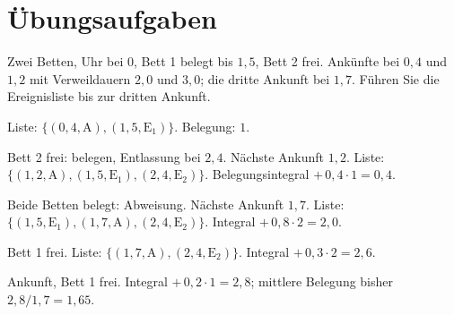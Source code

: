 \section{Übungsaufgaben}

\begin{aufgabe}
Zwei Betten, Uhr bei $0$, Bett 1 belegt bis $1{,}5$, Bett 2 frei. Ankünfte bei $0{,}4$ und $1{,}2$ mit Verweildauern $2{,}0$ und $3{,}0$; die dritte Ankunft bei $1{,}7$. Führen Sie die Ereignisliste bis zur dritten Ankunft.

\loesung
{}
Liste: $\{(0{,}4,\text{A}), (1{,}5,\text{E}_1)\}$. Belegung: $1$.

Bett 2 frei: belegen, Entlassung bei $2{,}4$. Nächste Ankunft $1{,}2$. Liste: $\{(1{,}2,\text{A}), (1{,}5,\text{E}_1), (2{,}4,\text{E}_2)\}$. Belegungsintegral $+\,0{,}4\cdot1 = 0{,}4$.

Beide Betten belegt: Abweisung. Nächste Ankunft $1{,}7$. Liste: $\{(1{,}5,\text{E}_1), (1{,}7,\text{A}), (2{,}4,\text{E}_2)\}$. Integral $+\,0{,}8\cdot2 = 2{,}0$.

Bett 1 frei. Liste: $\{(1{,}7,\text{A}), (2{,}4,\text{E}_2)\}$. Integral $+\,0{,}3\cdot2 = 2{,}6$.

Ankunft, Bett 1 frei. Integral $+\,0{,}2\cdot1 = 2{,}8$; mittlere Belegung bisher $2{,}8/1{,}7 = 1{,}65$.

\begin{center}
\begin{minipage}{0.88\textwidth}
\end{minipage}
\end{center}
\end{aufgabe}

